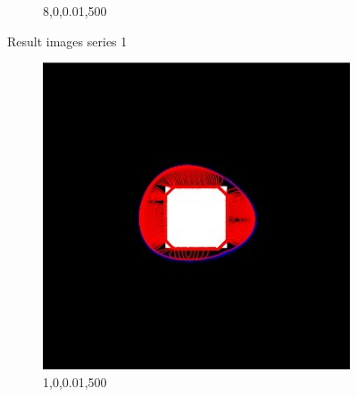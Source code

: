 \documentclass[paper=a4, fontsize=11pt]{scrartcl} %
\numberwithin{equation}{section} %
\numberwithin{figure}{section} %
\numberwithin{table}{section} %
\begin{document}
\begin{figure}[H]
\begin{subfigure}[b]{0.2\textwidth}
                \caption{8,0,0.01,500}
                \label{fig:Blacksquare4}
        \end{subfigure}
        \caption{Result images series 1 }\label{fig:animals}
\end{figure}

\begin{figure}[H]
        \centering
        \begin{subfigure}[b]{0.2\textwidth}
                \includegraphics[width=\textwidth]{111}
                \caption{1,0,0.01,500}
                \label{fig:Blacksquare5}
        \end{subfigure}%
        ~ %
        \begin{subfigure}[b]{0.2\textwidth}

\end{subfigure}
\end{figure}
\end{document}
